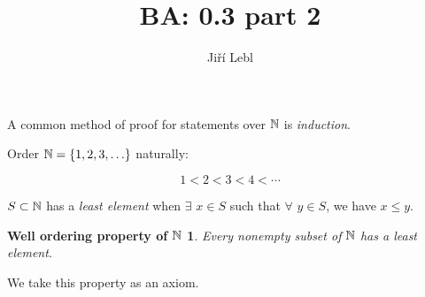 \documentclass[10pt,aspectratio=169]{beamer}
\author{Ji\v{r}\'i Lebl}
\institute[OSU]{%
Departemento pri Matematiko de Oklahoma {\^S}tata Universitato}
\title{BA: 0.3 part 2}
\date{}
\begin{document}
\theoremstyle{plain}
\newtheorem*{wellordprop}{Well ordering property of ${\mathbb{N}}$}

\begin{frame}
\titlepage
\end{frame}

\begin{frame}
A common method of proof for statements over ${\mathbb{N}}$ is \emph{induction}.

\medskip
\pause

Order ${\mathbb{N}} = \{ 1,2,3,\ldots \}$ naturally:

\[
1 < 2 < 3 < 4 < \cdots 
\]

\medskip
\pause

$S \subset {\mathbb{N}}$ has a \emph{least element} when $\exists$ $x \in S$ such that
$\forall$
$y \in S$, we have $x \leq y$.

\pause

\begin{wellordprop}
Every nonempty subset of ${\mathbb{N}}$ has a least element.
\end{wellordprop}

\pause

We take this property as an axiom.

\end{frame}
\end{document}
